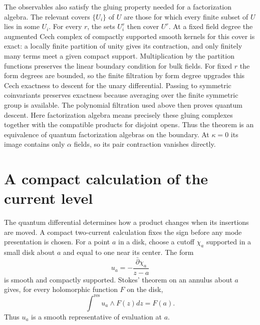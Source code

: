 The observables also satisfy the gluing property needed for a
factorization algebra.  The relevant covers $\{U_i\}$ of $U$ are
those for which every finite subset of $U$ lies in some $U_i$.
For every $r$, the sets $U_i^r$ then cover $U^r$.
At a fixed field degree the augmented Cech complex of compactly
supported smooth kernels for this cover is exact: a locally finite
partition of unity gives its contraction, and only finitely many
terms meet a given compact support.  Multiplication by the partition
functions preserves the linear boundary condition for bulk fields.
For fixed $r$ the form degrees are bounded, so the finite filtration
by form degree upgrades this Cech exactness to descent for the unary
differential.  Passing to symmetric coinvariants preserves exactness
because averaging over the finite symmetric group is available.
The polynomial filtration used above then proves quantum descent.
Here factorization algebra means precisely these gluing complexes
together with the compatible products for disjoint opens.
Thus the theorem is an equivalence of quantum factorization algebras
on the boundary.  At $\kappa=0$ its image contains only $\alpha$
fields, so its pair contraction vanishes directly.

\section{A compact calculation of the current level}

The quantum differential determines how a product changes when its
insertions are moved.  A compact two-current calculation fixes the
sign before any mode presentation is chosen.
For a point $a$ in a disk, choose a cutoff $\chi_a$ supported in a
small disk about $a$ and equal to one near its center.  The form
\[
 u_a=-\frac{\bar\partial\chi_a}{z-a}
\]
is smooth and compactly supported.  Stokes' theorem on an annulus
about $a$ gives, for every holomorphic function $F$ on the disk,
\[
 \int^{\mathrm{res}}u_a\wedge F(z)dz=F(a).
\]
Thus $u_a$ is a smooth representative of evaluation at $a$.

